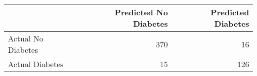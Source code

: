 \begin{tabular}{lrr}
\toprule
 & Predicted No Diabetes & Predicted Diabetes \\
\midrule
Actual No Diabetes & 370 & 16 \\
Actual Diabetes & 15 & 126 \\
\bottomrule
\end{tabular}
